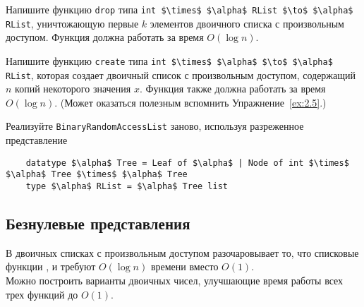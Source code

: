 \ifanswers
\begin{frame}[fragile]{}
\begin{exercise}\label{ex:9.1}
  Напишите функцию \lstinline!drop! типа
  \lstinline!int $\times$ $\alpha$ RList $\to$ $\alpha$ RList!, уничтожающую первые $k$
  элементов двоичного списка с произвольным доступом. Функция должна
  работать за время $O(\log n)$.
\end{exercise}

\begin{exercise}\label{ex:9.2}
  Напишите функцию \lstinline!create! типа
  \lstinline!int $\times$ $\alpha$ $\to$ $\alpha$ RList!, которая создает
  двоичный список с произвольным доступом, содержащий $n$ копий
  некоторого значения $x$. Функция также должна работать за время
  $O(\log n)$. (Может оказаться полезным вспомнить Упражнение~\ref{ex:2.5}.)
\end{exercise}

\begin{exercise}\label{ex:9.3}
  Реализуйте \lstinline!BinaryRandomAccessList! заново, используя
  разреженное представление
  \begin{lstlisting}
    datatype $\alpha$ Tree = Leaf of $\alpha$ | Node of int $\times$ $\alpha$ Tree $\times$ $\alpha$ Tree
    type $\alpha$ RList = $\alpha$ Tree list
  \end{lstlisting}
\end{exercise}
\end{frame}
\fi 

\subsection{Безнулевые представления}
\label{sc:9.2.2}

\begin{frame}[fragile]{}

В двоичных списках с произвольным доступом разочаровывает то, что
списковые функции ,  и
 требуют $O(\log n)$ времени вместо $O(1)$.\\


Можно построить варианты двоичных чисел,
улучшающие время работы всех трех функций до $O(1)$. 


\end{frame}

